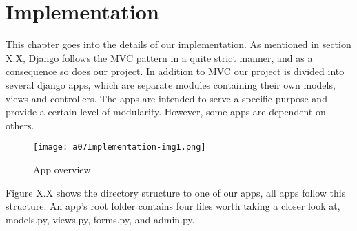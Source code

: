 \chapter{Implementation}

This chapter goes into the details of our implementation. As mentioned
in section X.X, Django follows the MVC pattern in a quite strict
manner, and as a consequence so does our project. In addition to MVC
our project is divided into several django apps, which are separate
modules containing their own models, views and controllers. The apps
are intended to serve a specific purpose and provide a certain level of
modularity. However, some apps are dependent on others.


\bigskip

\begin{figure}
	\texttt{[image: a07Implementation-img1.png]}
	\caption{App overview}
\end{figure}


\bigskip

Figure X.X shows the directory structure to one of our apps, all apps
follow this structure. An app{\textquoteright}s root folder contains
four files worth taking a closer look at, models.py, views.py,
forms.py, and admin.py. 


\bigskip

